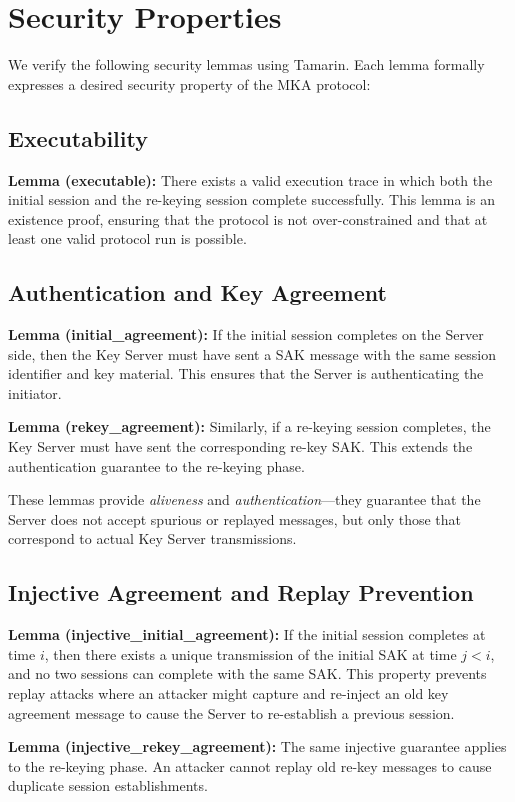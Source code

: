 \documentclass{llncs}
\begin{document}
\section{Security Properties}

We verify the following security lemmas using Tamarin. Each lemma formally expresses a desired security property of the MKA protocol:

\subsection{Executability}
\textbf{Lemma (executable):} There exists a valid execution trace in which both the initial session and the re-keying session complete successfully. This lemma is an existence proof, ensuring that the protocol is not over-constrained and that at least one valid protocol run is possible.

\subsection{Authentication and Key Agreement}
\textbf{Lemma (initial\_agreement):} If the initial session completes on the Server side, then the Key Server must have sent a SAK message with the same session identifier and key material. This ensures that the Server is authenticating the initiator.

\textbf{Lemma (rekey\_agreement):} Similarly, if a re-keying session completes, the Key Server must have sent the corresponding re-key SAK. This extends the authentication guarantee to the re-keying phase.

These lemmas provide \emph{aliveness} and \emph{authentication}---they guarantee that the Server does not accept spurious or replayed messages, but only those that correspond to actual Key Server transmissions.

\subsection{Injective Agreement and Replay Prevention}
\textbf{Lemma (injective\_initial\_agreement):} If the initial session completes at time $i$, then there exists a unique transmission of the initial SAK at time $j < i$, and no two sessions can complete with the same SAK. This property prevents replay attacks where an attacker might capture and re-inject an old key agreement message to cause the Server to re-establish a previous session.

\textbf{Lemma (injective\_rekey\_agreement):} The same injective guarantee applies to the re-keying phase. An attacker cannot replay old re-key messages to cause duplicate session establishments.
\end{document}
